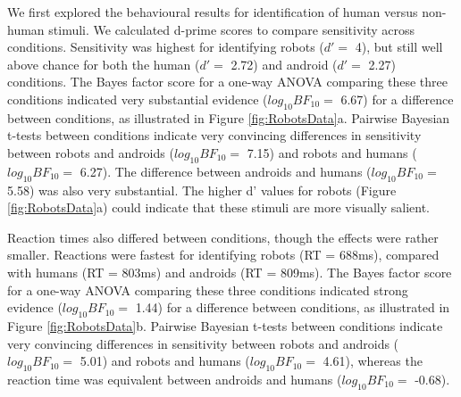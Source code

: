 \documentclass[
]{article}
\begin{document}
We first explored the behavioural results for identification of human versus non-human stimuli. We calculated d-prime scores to compare sensitivity across conditions. Sensitivity was highest for identifying robots (\(d' =\) 4), but still well above chance for both the human (\(d' =\) 2.72) and android (\(d' =\) 2.27) conditions. The Bayes factor score for a one-way ANOVA comparing these three conditions indicated very substantial evidence (\(log_{10}BF_{10} =\) 6.67) for a difference between conditions, as illustrated in Figure \ref{fig:RobotsData}a. Pairwise Bayesian t-tests between conditions indicate very convincing differences in sensitivity between robots and androids (\(log_{10}BF_{10} =\) 7.15) and robots and humans (\(log_{10}BF_{10} =\) 6.27). The difference between androids and humans (\(log_{10}BF_{10} =\) 5.58) was also very substantial. The higher d' values for robots (Figure \ref{fig:RobotsData}a) could indicate that these stimuli are more visually salient.

Reaction times also differed between conditions, though the effects were rather smaller. Reactions were fastest for identifying robots (RT = 688ms), compared with humans (RT = 803ms) and androids (RT = 809ms). The Bayes factor score for a one-way ANOVA comparing these three conditions indicated strong evidence (\(log_{10}BF_{10} =\) 1.44) for a difference between conditions, as illustrated in Figure \ref{fig:RobotsData}b. Pairwise Bayesian t-tests between conditions indicate very convincing differences in sensitivity between robots and androids (\(log_{10}BF_{10} =\) 5.01) and robots and humans (\(log_{10}BF_{10} =\) 4.61), whereas the reaction time was equivalent between androids and humans (\(log_{10}BF_{10} =\) -0.68).
\end{document}

